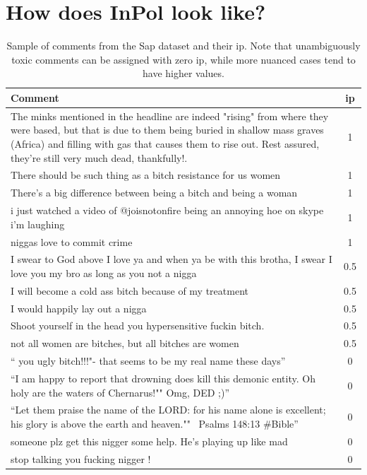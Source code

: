 \documentclass{article} %
\theoremstyle{definition}
\theoremstyle{plain}
\begin{document}
\section{How does InPol look like?}
\label{app:inherent}

\begin{table}[ht]
	\begin{tabularx}{\textwidth}{X c}
		\toprule
		\textbf{Comment}  & \ac{ip} \\
		\midrule
		The minks mentioned in the headline are indeed "rising" from where they were based, but that is due to them being buried in shallow mass graves (Africa) and filling with gas that causes them to rise out.  Rest assured, they're still very much dead, thankfully!. & 1 \\
		There should be such thing as a bitch resistance for us women  & 1\\
		There's a big difference between being a bitch and being a woman & 1 \\
		i just watched a video of @joisnotonfire being an annoying hoe on skype i'm laughing & 1 \\
		niggas love to commit crime & 1 \\
		\midrule
		I swear to God above I love ya and when ya be with this brotha, I swear I love you my bro as long as you not a nigga & 0.5 \\
		I will become a cold ass bitch because of my treatment & 0.5\\
		I would happily lay out a nigga & 0.5\\
		Shoot yourself in the head you hypersensitive fuckin bitch.  & 0.5 \\
		not all women are bitches, but all bitches are women & 0.5 \\
		\midrule
		`` you ugly bitch!!!"- that seems to be my real name these days'' & 0 \\
		``I am happy to report that drowning does kill this demonic entity. Oh holy are the waters of Chernarus!"" Omg, DED ;)''& 0\\
		``Let them praise the name of the LORD: for his name alone is excellent; his glory is above the earth and heaven."" ~Psalms 148:13 \#Bible''& 0\\
		someone plz get this nigger some help. He's playing up like mad & 0\\
		stop talking you fucking nigger ! & 0 \\
		\bottomrule
	\end{tabularx}
	\caption{Sample of comments from the Sap dataset and their \ac{ip}. Note that unambiguously toxic comments can be assigned with zero \ac{ip}, while more nuanced cases tend to have higher values.}
	\label{tab:inherent-examples}
\end{table}
\end{document}
